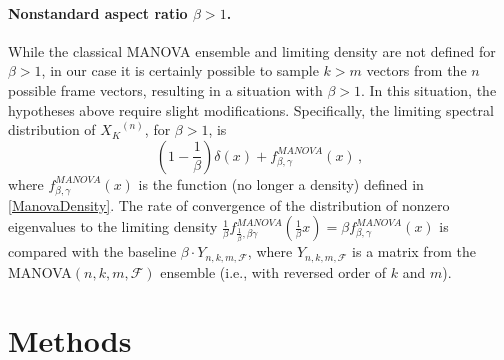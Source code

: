 \documentclass[a4paper,12pt]{article}
\newcommand{\TODO}[1]{ {\tt \color{red} [TODO:#1] } }
\newcommand{\Fc}{\ensuremath{\mathcal{F}}}
\newcommand{\m}{m}
\newcommand{\Xk}{\ensuremath{X_K}}
\begin{document}
\paragraph{Nonstandard aspect ratio $\beta>1$.}
While the classical MANOVA ensemble and limiting density are not defined for
$\beta>1$, in our case it is certainly possible to sample $k>m$ vectors from the
$n$ possible frame vectors, resulting in a situation with $\beta>1$.
In this situation, the hypotheses above require slight modifications.
Specifically, the limiting 
spectral distribution of $\Xk^{(n)}$, for $\beta>1$, is
\begin{equation}
\label{ManovaDensityBeta}
	\left(1-\frac{1}{\beta}\right) \delta(x)+f_{\beta,\gamma}^{MANOVA}(x)\,,
\end{equation}
where $f_{\beta,\gamma}^{MANOVA}(x)$ is the function (no longer a density) 
defined in \eqref{ManovaDensity}.
The rate of convergence of the distribution of nonzero eigenvalues to the
limiting density
$\frac{1}{\beta}f_{\frac{1}{\beta},\beta\gamma}^{MANOVA}(\frac{1}{\beta}x)=\beta
f_{\beta,\gamma}^{MANOVA}(x)$ is compared with 
the baseline $\beta\cdot Y_{n,k,\m,\Fc}$, where $Y_{n,k,\m,\Fc}$ is a matrix from the MANOVA$(n,k,\m,\Fc)$ ensemble
(i.e., with reversed order of $k$ and $m$).



\section*{Methods} \label{sec:methods}
\end{document}

